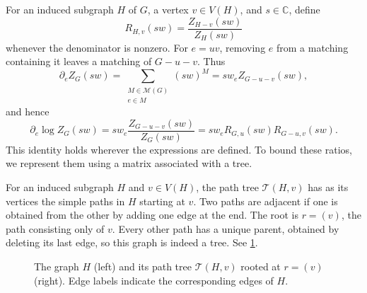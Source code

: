 \documentclass[11pt,reqno,letterpaper]{amsart}
\numberwithin{equation}{section}
\theoremstyle{definition}
\theoremstyle{remark}
\newcommand{\C}{\mathbb C}
\newcommand{\cM}{\mathcal M}
\begin{document}
For an induced subgraph $H$ of $G$, a vertex $v\in V(H)$, and
$s\in\C$, define 
\[
 R_{H,v}(sw)=\frac{Z_{H-v}(sw)}{Z_H(sw)}
\]
whenever the denominator is nonzero. For $e=uv$, removing $e$ from
a matching containing it leaves a matching of $G-u-v$. Thus
\[
 \partial_e Z_G(sw)
 =\sum_{\substack{M\in\cM(G)\\e\in M}}(sw)^M
 =sw_eZ_{G-u-v}(sw),
\]
and hence
\begin{equation*}
 \partial_e\log Z_G(sw)
 =sw_e\frac{Z_{G-u-v}(sw)}{Z_G(sw)}
 =sw_eR_{G,u}(sw)R_{G-u,v}(sw).
\end{equation*}
This identity holds wherever the expressions are defined.
To bound these ratios, we represent them using a matrix associated
with a tree.

For an induced subgraph $H$ and $v\in V(H)$, the {path tree}
$\mathcal T(H,v)$ has as its vertices the simple paths in $H$
starting at $v$. Two paths are adjacent if one is obtained from
the other by adding one edge at the end. The root is $r=(v)$,
the path consisting only of $v$. Every other path has a unique
parent, obtained by deleting its last edge, so this graph is
indeed a tree. See \cref{fig:path-tree}.

\begin{figure}[htbp]
\centering
{}
\caption{The graph $H$ (left) and its path tree $\mathcal T(H,v)$
rooted at $r=(v)$ (right). Edge labels indicate the corresponding
edges of $H$.}
\label{fig:path-tree}
\end{figure}
\end{document}
